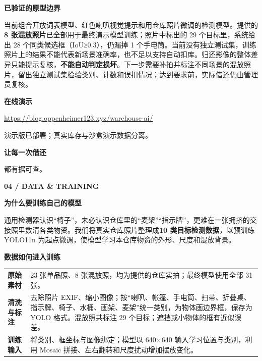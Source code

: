 \documentclass[UTF8,fontset=none,11pt,a4paper]{ctexart}
\newcommand{\eyebrow}[1]{{\small\bfseries\color{forest}#1}}
\newcommand{\pageheading}[2]{\eyebrow{#1}\par\vspace{2mm}{\fontsize{23}{29}\selectfont\bfseries #2}\par\vspace{3mm}{\color{gold}\rule{24mm}{1.4pt}}\par\vspace{5mm}}
\newcommand{\smalllabel}[1]{{\footnotesize\bfseries\color{forest}#1}}
\begin{document}
\vspace{7mm}
\smalllabel{已验证的原型边界}\par\vspace{3mm}
\begin{softbox}
当前组合开放词表模型、红色喇叭视觉提示和用仓库照片微调的检测模型。提供的\textbf{8 张混放照片}已全部用于最终演示模型训练；照片中标出的 29 个目标里，系统给出 28 个同类候选框（IoU≥0.3），仍漏掉 1 个手电筒。当前没有独立测试集，训练照片上的结果不能代表新场景准确率，也不足以支持自动扣库。归还影像的整体差异只能提示复核，\textbf{不能自动判定损坏}。下一步需要补拍并标注不同场景的混放照片，留出独立测试集检验类别、计数和误扣情况；达到要求前，实际借还仍由管理员复核。
\end{softbox}

\vspace{6mm}
\begin{minipage}[c]{0.72\linewidth}
\smalllabel{在线演示}\par\vspace{1mm}
\href{https://blog.oppenheimer123.xyz/warehouse-ai/}{https://blog.oppenheimer123.xyz/warehouse-ai/}\par\vspace{2mm}
{\footnotesize\color{slate}演示版已部署；真实库存与沙盒演示数据分离。}
\end{minipage}\hfill
\begin{minipage}[c]{0.25\linewidth}\raggedleft
{\footnotesize\color{forest}\bfseries 让每一次借还\par 都有据可查。}
\end{minipage}

\newpage
\pageheading{04 / DATA \& TRAINING}{从仓库实拍到专用检测器}
\begin{greenbox}
\smalllabel{为什么要训练自己的模型}\par\vspace{2mm}
通用检测器认识“椅子”，未必认识仓库里的“麦架”“指示牌”，更难在一张拥挤的交接照里数清各类物资。我们将真实仓库照片整理成\textbf{10 类目标检测数据}，以预训练 YOLO11n 为起点微调，使模型学习本仓库物资的外形、尺度和混放背景。
\end{greenbox}

\vspace{5mm}
\smalllabel{数据如何进入训练}\par\vspace{2mm}
\begin{tabularx}{\linewidth}{@{}>{\bfseries}p{28mm}X@{}}
\color{forest}原始素材 & 23 张单品照、8 张混放照，均为提供的仓库实拍；最终模型使用全部 31 张。\\
\color{forest}清洗与标注 & 去除照片 EXIF、缩小图像；按“喇叭、帐篷、手电筒、扫帚、折叠桌、指示牌、椅子、水桶、画架、麦架”统一类别，为物体画边界框，保存为 YOLO 格式。混放照共标注 29 个目标；遮挡或小物体的框有近似误差。\\
\color{forest}训练输入 & 将类别、框坐标与图像绑定；模型以 640×640 输入学习位置与类别，利用 Mosaic 拼接、左右翻转和尺度扰动增加摆放变化。\\
\end{tabularx}
\end{document}

